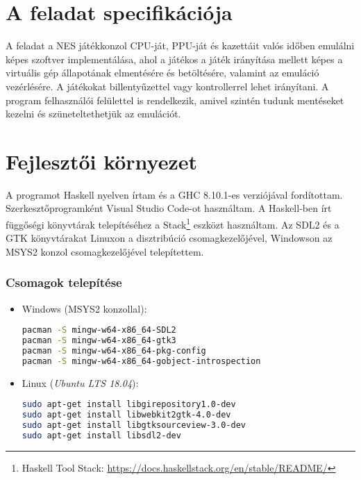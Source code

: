\section{A feladat specifikációja}

A feladat a NES játékkonzol CPU-ját, PPU-ját és kazettáit valós időben emulálni képes szoftver implementálása, ahol a játékos a játék irányítása mellett képes a virtuális gép állapotának elmentésére és betöltésére, valamint az emuláció vezérlésére. A játékokat billentyűzettel vagy kontrollerrel lehet irányítani. A program felhasználói felülettel is rendelkezik, amivel szintén tudunk mentéseket kezelni és szüneteltethetjük az emulációt.

\section{Fejlesztői környezet}
\label{sec:build}

A programot Haskell nyelven írtam és a GHC 8.10.1-es verziójával fordítottam. Szerkesztőprogramként Visual Studio Code-ot használtam. A Haskell-ben írt függőségi könyvtárak telepítéséhez a Stack\footnote{Haskell Tool Stack: \url{https://docs.haskellstack.org/en/stable/README/}} eszközt használtam.
Az SDL2 és a GTK könyvtárakat Linuxon a disztribúció csomagkezelőjével, Windowson az MSYS2 konzol csomagkezelőjével telepítettem. 
\clearpage
\subsubsection{Csomagok telepítése}
\begin{itemize}
	\item Windows (MSYS2 konzollal):
\begin{lstlisting}[language=bash]
pacman -S mingw-w64-x86_64-SDL2
pacman -S mingw-w64-x86_64-gtk3
pacman -S mingw-w64-x86_64-pkg-config
pacman -S mingw-w64-x86_64-gobject-introspection
\end{lstlisting}
	\item Linux (\emph{Ubuntu LTS 18.04}):
\begin{lstlisting}[language=bash]
sudo apt-get install libgirepository1.0-dev
sudo apt-get install libwebkit2gtk-4.0-dev
sudo apt-get install libgtksourceview-3.0-dev
sudo apt-get install libsdl2-dev
\end{lstlisting}
\end{itemize}

